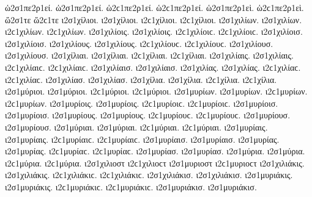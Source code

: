 {ὡ2σ1πε2ρ1εί. ὡ2σ1πε2ρ1εί. ὡ2ϲ1πε2ρ1εί. ὡ2ϲ1πε2ρ1εί.   %
ὡ2σ1πε2ρ1εὶ. ὡ2ϲ1πε2ρ1εὶ. 
ὥ2σ1τε ὥ2ϲ1τε   %
ι2σ1χίλιοι. ι2σ1χίλιοι. ι2ϲ1χίλιοι. ι2ϲ1χίλιοι.   %
ι2σ1χιλίων. ι2σ1χιλίων. ι2ϲ1χιλίων. ι2ϲ1χιλίων. 
ι2σ1χιλίοις. ι2σ1χιλίοις. ι2ϲ1χιλίοιϲ. ι2ϲ1χιλίοιϲ. 
ι2σ1χιλίοισ. ι2σ1χιλίοισ. 
ι2σ1χιλίους. ι2σ1χιλίους. ι2ϲ1χιλίουϲ. ι2ϲ1χιλίουϲ. 
ι2σ1χιλίουσ. ι2σ1χιλίουσ. 
ι2σ1χίλιαι. ι2σ1χίλιαι. ι2ϲ1χίλιαι. ι2ϲ1χίλιαι. 
ι2σ1χιλίαις. ι2σ1χιλίαις. ι2ϲ1χιλίαιϲ. ι2ϲ1χιλίαιϲ. 
ι2σ1χιλίαισ. ι2σ1χιλίαισ. 
ι2σ1χιλίας. ι2σ1χιλίας. ι2ϲ1χιλίαϲ. ι2ϲ1χιλίαϲ. 
ι2σ1χιλίασ. ι2σ1χιλίασ. 
ι2σ1χίλια. ι2σ1χίλια. ι2ϲ1χίλια. ι2ϲ1χίλια. 
%
ι2σ1μύριοι. ι2σ1μύριοι. ι2ϲ1μύριοι. ι2ϲ1μύριοι.   %
ι2σ1μυρίων. ι2σ1μυρίων. ι2ϲ1μυρίων. ι2ϲ1μυρίων. 
ι2σ1μυρίοις. ι2σ1μυρίοις. ι2ϲ1μυρίοιϲ. ι2ϲ1μυρίοιϲ. 
ι2σ1μυρίοισ. ι2σ1μυρίοισ. 
ι2σ1μυρίους. ι2σ1μυρίους. ι2ϲ1μυρίουϲ. ι2ϲ1μυρίουϲ. 
ι2σ1μυρίουσ. ι2σ1μυρίουσ. 
ι2σ1μύριαι. ι2σ1μύριαι. ι2ϲ1μύριαι. ι2ϲ1μύριαι. 
ι2σ1μυρίαις. ι2σ1μυρίαις. ι2ϲ1μυρίαιϲ. ι2ϲ1μυρίαιϲ. 
ι2σ1μυρίαισ. ι2σ1μυρίαισ. 
ι2σ1μυρίας. ι2σ1μυρίας. ι2ϲ1μυρίαϲ. ι2ϲ1μυρίαϲ. 
ι2σ1μυρίασ. ι2σ1μυρίασ. 
ι2σ1μύρια. ι2σ1μύρια. ι2ϲ1μύρια. ι2ϲ1μύρια. 
%
ι2σ1χιλιοστ ι2ϲ1χιλιοϲτ   %
%
ι2σ1μυριοστ ι2ϲ1μυριοϲτ   %
%
ι2σ1χιλιάκις. ι2σ1χιλιάκις. ι2ϲ1χιλιάκιϲ. ι2ϲ1χιλιάκιϲ.   %
ι2σ1χιλιάκισ. ι2σ1χιλιάκισ. 
%
ι2σ1μυριάκις. ι2σ1μυριάκις. ι2ϲ1μυριάκιϲ. ι2ϲ1μυριάκιϲ.   %
ι2σ1μυριάκισ. ι2σ1μυριάκισ. 
}
